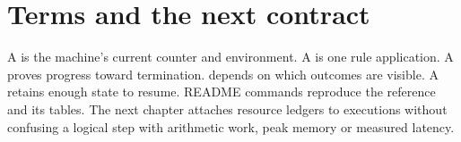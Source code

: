 \section{Terms and the next contract}
A  is the machine's current counter and environment.
A  is one rule application. A  proves
progress toward termination.  depends on which
outcomes are visible. A  retains enough state to resume.
README commands reproduce the reference and its tables.
The next chapter attaches resource ledgers to executions without confusing
a logical step with arithmetic work, peak memory or measured latency.

